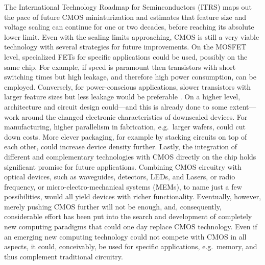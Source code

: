 The International Technology Roadmap for Seminconductors (ITRS) \cite{itrs2011}
maps out the pace of future CMOS miniaturization and estimates that feature size
and voltage scaling can continue for one or two decades, before reaching its
absolute lower limit. Even with the scaling limits approaching, CMOS is still a
very viable technology with several strategies for future improvements. On the
MOSFET level, specialized FETs for specific applications could be used, possibly
on the same chip. For example, if speed is paramount then transistors with short
switching times but high leakage, and therefore high power consumption, can be
employed. Conversely, for power-conscious applications, slower transistors with
larger feature sizes but less leakage would be preferable
\cite{cavin2012science}. On a higher level, architecture and circuit design
could---and this is already done to some extent---work around the changed
electronic characteristics of downscaled devices. For manufacturing, higher
parallelism in fabrication, e.g.~larger wafers, could cut down costs. More
clever packaging, for example by stacking circuits on top of each other, could
increase device density further. Lastly, the integration of different and
complementary technologies with CMOS directly on the chip holds significant
promise for future applications. Combining CMOS circuitry with optical devices,
such as waveguides, detectors, LEDs, and Lasers, or radio frequency, or
micro-electro-mechanical systems (MEMs), to name just a few possibilities, would
all yield devices with richer functionality. Eventually, however, merely pushing
CMOS further will not be enough, and, consequently, considerable effort has been
put into the search and development of completely new computing paradigms that
could one day replace CMOS technology. Even if an emerging new computing
technology could not compete with CMOS in all aspects, it could, conceivably, be
used for specific applications, e.g.~memory, and thus complement traditional
circuitry.


